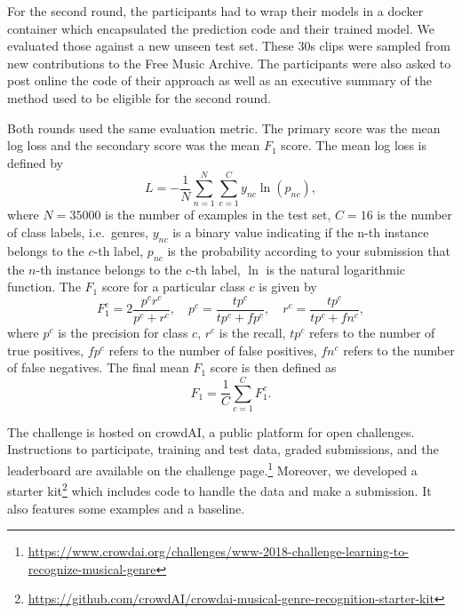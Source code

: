 \documentclass[sigconf]{acmart}
\begin{document}
For the second round, the participants had to wrap their models in a docker container which encapsulated the prediction code and their trained model.
We evaluated those against a new unseen test set. These 30s clips were sampled from new contributions to the Free Music Archive.
The participants were also asked to post online the code of their approach as well as an executive summary of the method used to be eligible for the second round.

Both rounds used the same evaluation metric. The primary score was the mean log loss and the secondary score was the mean $F_1$ score.
The mean log loss is defined by
\begin{equation}
	L = - \frac{1}{N} \sum_{n=1}^N \sum_{c=1}^{C} y_{nc} \ln(p_{nc}),
\end{equation}
where $N=35000$ is the number of examples in the test set,
$C=16$ is the number of class labels, i.e.\ genres,
$y_{nc}$ is a binary value indicating if the n-th instance belongs to the $c$-th label,
$p_{nc}$ is the probability according to your submission that the $n$-th instance belongs to the $c$-th label,
$\ln$ is the natural logarithmic function.
The $F_1$ score for a particular class $c$ is given by
\begin{equation}
	F_1^c = 2\frac{p^c r^c}{p^c + r^c}, \hspace{1em}
	p^c = \frac{tp^c}{tp^c + fp^c}, \hspace{1em}
	r^c = \frac{tp^c}{tp^c + fn^c},
\end{equation}
where
$p^c$ is the precision for class $c$,
$r^c$ is the recall,
$tp^c$ refers to the number of true positives,
$fp^c$ refers to the number of false positives,
$fn^c$ refers to the number of false negatives.
The final mean $F_1$ score is then defined as
\begin{equation}
	F_1 = \frac{1}{C} \sum_{c=1}^{C} F_1^c.
\end{equation}

The challenge is hosted on crowdAI, a public platform for open challenges. Instructions to participate, training and test data, graded submissions, and the leaderboard are available on the challenge page.\footnote{\url{https://www.crowdai.org/challenges/www-2018-challenge-learning-to-recognize-musical-genre}}
Moreover, we developed a starter kit\footnote{\url{https://github.com/crowdAI/crowdai-musical-genre-recognition-starter-kit}} which includes code to handle the data and make a submission. It also features some examples and a baseline.
\end{document}
